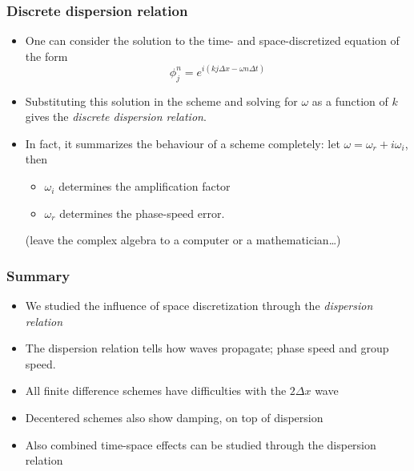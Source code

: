 \documentclass[aspectratio=149,9pt]{beamer}
\begin{document}
%
%
\begin{frame}
	\frametitle{Discrete dispersion relation}
	\vfill\begin{itemize}
		\item One can consider the solution to the time- and space-discretized equation of the form
			\begin{equation*}
				\phi_j^n = e^{i \left( k j \Delta x - \omega n \Delta t \right)}
			\end{equation*}
		\item Substituting this solution in the scheme and solving for $\omega$ as a function of $k$ gives the \emph{discrete dispersion relation}.\vfill
		\item In fact, it summarizes the behaviour of a scheme completely: let $\omega = \omega_r + i \omega_i$, then\vfill
			\begin{itemize}
				\item $\omega_i$ determines the amplification factor\vfill
				\item $\omega_r$ determines the phase-speed error.\vfill
			\end{itemize}
			(leave the complex algebra to a computer or a mathematician\ldots)
	\end{itemize}\vfill
\end{frame}
%
%
\begin{frame}
	\frametitle{Summary}
	\vfill\begin{itemize}
		\item We studied the influence of space discretization through the \emph{dispersion relation}\vfill
		\item The dispersion relation tells how waves propagate; phase speed and group speed.\vfill
		\item All finite difference schemes have difficulties with the $2\Delta x$ wave\vfill
		\item Decentered schemes also show damping, on top of dispersion\vfill
		\item Also combined time-space effects can be studied through the dispersion relation
	\end{itemize}\vfill
\end{frame}
%
%
\end{document}
